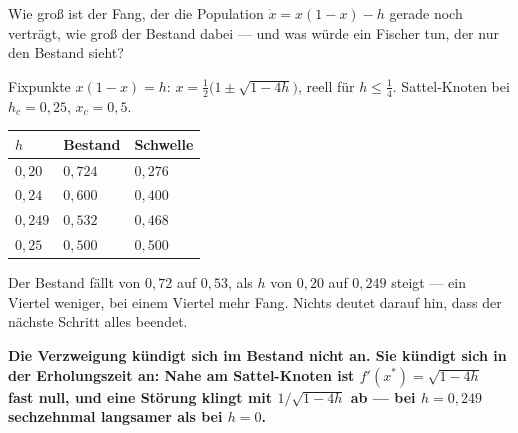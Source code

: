 \begin{aufgabe}
Wie groß ist der Fang, der die Population $\dot x = x(1-x) - h$ gerade noch verträgt, wie groß der Bestand dabei --- und was würde ein Fischer tun, der nur den Bestand sieht?

\loesung
{}
Fixpunkte $x(1-x) = h$: $x = \tfrac12\big(1\pm\sqrt{1-4h}\big)$, reell für $h \le \tfrac14$. Sattel-Knoten bei $h_c = 0{,}25$, $x_c = 0{,}5$.

\begin{center}
{\small
\renewcommand{\arraystretch}{1.48}
\begin{tabular}{@{}P{1.4cm}P{2.0cm}P{2.6cm}@{}}
\toprule
$h$ & \textbf{Bestand} & \textbf{Schwelle}\\
\midrule
$0{,}20$ & $0{,}724$ & $0{,}276$\\
$0{,}24$ & $0{,}600$ & $0{,}400$\\
$0{,}249$ & $0{,}532$ & $0{,}468$\\
$0{,}25$ & $0{,}500$ & $0{,}500$\\
\bottomrule
\end{tabular}}
\end{center}

Der Bestand fällt von $0{,}72$ auf $0{,}53$, als $h$ von $0{,}20$ auf $0{,}249$ steigt --- ein Viertel weniger, bei einem Viertel mehr Fang. Nichts deutet darauf hin, dass der nächste Schritt alles beendet.

\begin{center}
\begin{minipage}{0.9\textwidth}
\textbf{Die Verzweigung kündigt sich im Bestand nicht an. Sie kündigt sich in der Erholungszeit an: Nahe am Sattel-Knoten ist $f'(x^{*}) = \sqrt{1-4h}$ fast null, und eine Störung klingt mit $1/\sqrt{1-4h}$ ab --- bei $h = 0{,}249$ sechzehnmal langsamer als bei $h = 0$.}
\end{minipage}
\end{center}

\begin{center}
\begin{minipage}{0.88\textwidth}
\end{minipage}
\end{center}
\end{aufgabe}

